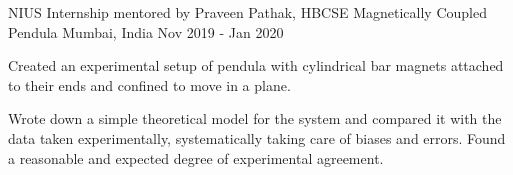 
\begin{cventries}

  \cventry
    {NIUS Internship mentored by Praveen Pathak, HBCSE} %
    {Magnetically Coupled Pendula} %
    {Mumbai, India} %
    {Nov 2019 - Jan 2020} %
    {
      \begin{cvitems} %
        \item {Created an experimental setup of pendula with cylindrical bar magnets attached to their ends and confined to move in a plane.}
        \item {Wrote down a simple theoretical model for the system and compared it with the data taken experimentally, systematically taking care of biases and errors. Found a reasonable and expected degree of experimental agreement.}
      \end{cvitems}
    }



\end{cventries}
